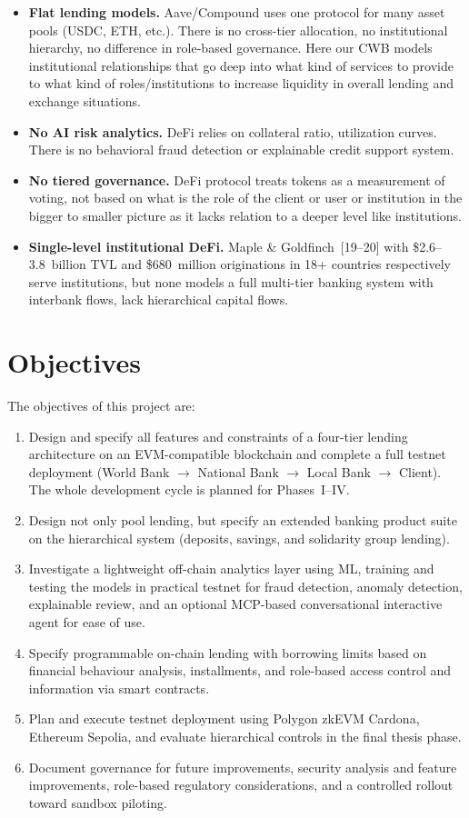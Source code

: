 \documentclass[12pt, a4paper]{report}
\begin{document}
\begin{itemize}[noitemsep]
\item \textbf{Flat lending models.} Aave/Compound uses one protocol for many asset pools (USDC, ETH, etc.). There is no cross-tier allocation, no institutional hierarchy, no difference in role-based governance. Here our CWB models institutional relationships that go deep into what kind of services to provide to what kind of roles/institutions to increase liquidity in overall lending and exchange situations.
\item \textbf{No AI risk analytics.} DeFi relies on collateral ratio, utilization curves. There is no behavioral fraud detection or explainable credit support system.
\item \textbf{No tiered governance.} DeFi protocol treats tokens as a measurement of voting, not based on what is the role of the client or user or institution in the bigger to smaller picture as it lacks relation to a deeper level like institutions.
\item \textbf{Single-level institutional DeFi.} Maple \& Goldfinch~[19--20] with \$2.6--3.8~billion TVL and \$680~million originations in 18+ countries respectively serve institutions, but none models a full multi-tier banking system with interbank flows, lack hierarchical capital flows.
\end{itemize}

\section{Objectives}

The objectives of this project are:

\begin{enumerate}[noitemsep]
\item Design and specify all features and constraints of a four-tier lending architecture on an EVM-compatible blockchain and complete a full testnet deployment (World Bank $\to$ National Bank $\to$ Local Bank $\to$ Client). The whole development cycle is planned for Phases~I--IV.
\item Design not only pool lending, but specify an extended banking product suite on the hierarchical system (deposits, savings, and solidarity group lending).
\item Investigate a lightweight off-chain analytics layer using ML, training and testing the models in practical testnet for fraud detection, anomaly detection, explainable review, and an optional MCP-based conversational interactive agent for ease of use.
\item Specify programmable on-chain lending with borrowing limits based on financial behaviour analysis, installments, and role-based access control and information via smart contracts.
\item Plan and execute testnet deployment using Polygon zkEVM Cardona, Ethereum Sepolia, and evaluate hierarchical controls in the final thesis phase.
\item Document governance for future improvements, security analysis and feature improvements, role-based regulatory considerations, and a controlled rollout toward sandbox piloting.
\end{enumerate}
\end{document}
